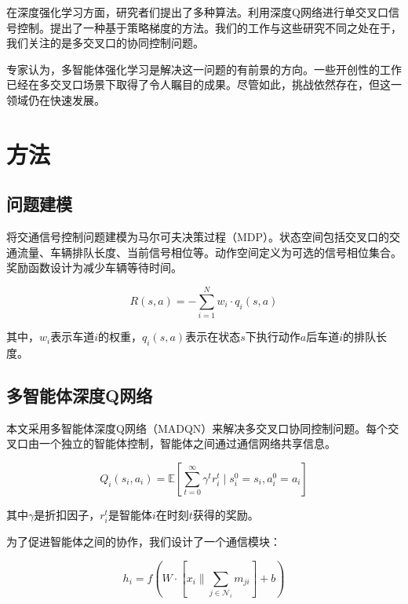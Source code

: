\documentclass[12pt,a4paper]{article}
\begin{document}
在深度强化学习方面，研究者们提出了多种算法。\cite{li2016}利用深度Q网络进行单交叉口信号控制。\cite{wei2018}提出了一种基于策略梯度的方法。我们的工作与这些研究不同之处在于，我们关注的是多交叉口的协同控制问题。

专家认为，多智能体强化学习是解决这一问题的有前景的方向。一些开创性的工作已经在多交叉口场景下取得了令人瞩目的成果。尽管如此，挑战依然存在，但这一领域仍在快速发展。

\section{方法}

\subsection{问题建模}

将交通信号控制问题建模为马尔可夫决策过程（MDP）。状态空间包括交叉口的交通流量、车辆排队长度、当前信号相位等。动作空间定义为可选的信号相位集合。奖励函数设计为减少车辆等待时间。

\begin{equation}
    R(s, a) = -\sum_{i=1}^{N} w_i \cdot q_i(s, a)
    \label{eq:reward}
\end{equation}

其中，$w_i$表示车道$i$的权重，$q_i(s, a)$表示在状态$s$下执行动作$a$后车道$i$的排队长度。

\subsection{多智能体深度Q网络}

本文采用多智能体深度Q网络（MADQN）来解决多交叉口协同控制问题。每个交叉口由一个独立的智能体控制，智能体之间通过通信网络共享信息。

\begin{equation}
    Q_i(s_i, a_i) = \mathbb{E}\left[\sum_{t=0}^{\infty} \gamma^t r_i^{t} \mid s_i^0 = s_i, a_i^0 = a_i\right]
    \label{eq:qfunction}
\end{equation}

其中$\gamma$是折扣因子，$r_i^t$是智能体$i$在时刻$t$获得的奖励。

为了促进智能体之间的协作，我们设计了一个通信模块：

\begin{equation}
    h_i = f\left(W \cdot \left[x_i \mathbin{\|} \sum_{j \in \mathcal{N}_i} m_{ji}\right] + b\right)
    \label{eq:comm}
\end{equation}
\end{document}
